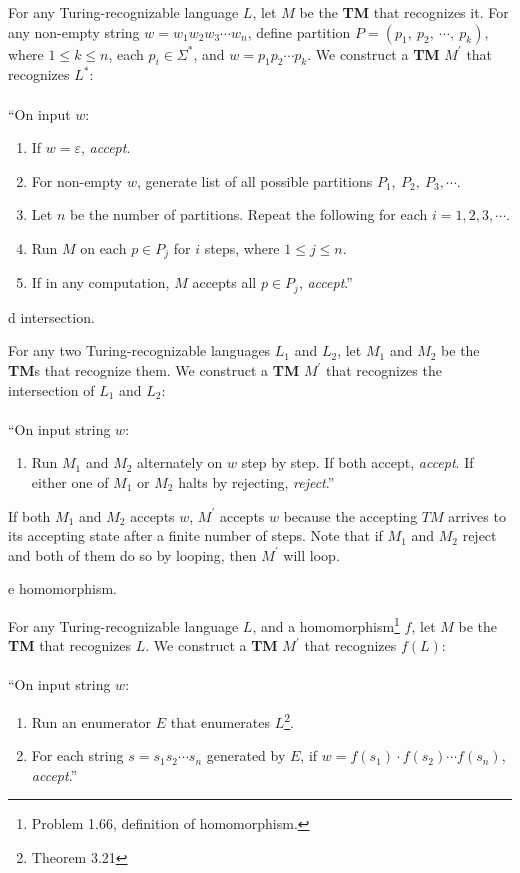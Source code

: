 \documentclass[11pt]{article}
\begin{document}
For any Turing-recognizable language $L$, let $M$ be the \textbf{TM} that recognizes it. For any non-empty string $w = w_1w_2w_3 \cdots w_n$, define partition $P = (p_1, \  p_2, \ \cdots , \ p_k)$, where $1 \leq k \leq n$, each $p_i \in \Sigma^{*}$, and $w = p_1  p_2 \cdots p_k$. We construct a \textbf{TM} $M^{'}$ that recognizes $L^{*}$: \\
\\
\textquotedblleft On input $w$:
\begin{enumerate}
\item If $w = \varepsilon$, \textit{accept}.
\item For non-empty $w$, generate list of all possible partitions $P_1, \ P_2, \ P_3, \cdots$.
\item Let $n$ be the number of partitions. Repeat the following for each $i = 1, 2, 3, \cdots$.
\item \hspace*{0.5cm} Run $M$ on each $p \in P_j$ for $i$ steps, where $1 \leq j \leq n$.
\item \hspace*{0.5cm} If in any computation, $M$ accepts all $p \in P_j$, \textit{accept}.\textquotedblright
\end{enumerate}

\begin{problem}[Part]{d}
intersection.
\end{problem}

For any two Turing-recognizable languages $L_1$ and $L_2$, let $M_1$ and $M_2$ be the \textbf{TM}s that recognize them. We construct a \textbf{TM} $M^{'}$ that recognizes the intersection of $L_1$ and $L_2$: \\
\\
\textquotedblleft On input string $w$:
\begin{enumerate}
\item Run $M_1$ and $M_2$ alternately on $w$ step by step. If both accept, \textit{accept}. If either one of $M_1$ or $M_2$ halts by rejecting, \textit{reject}.\textquotedblright
\end{enumerate}
If both $M_1$ and $M_2$ accepts $w$, $M^{'}$ accepts $w$ because the accepting $TM$ arrives to its accepting state after a finite number of steps. Note that if $M_1$ and $M_2$ reject and both of them do so by looping, then $M^{'}$ will loop.

\begin{problem}[Part]{e}
homomorphism.
\end{problem}

For any Turing-recognizable language $L$, and a homomorphism\footnote{Problem 1.66, definition of homomorphism.} $f$, let $M$ be the \textbf{TM} that recognizes $L$. We construct a \textbf{TM} $M^{'}$ that recognizes $f(L)$: \\
\\
\textquotedblleft On input string $w$:
\begin{enumerate}
\item Run an enumerator $E$ that enumerates $L$\footnote{Theorem 3.21}.
\item For each string $s=s_1s_2 \cdots s_n$ generated by $E$, if $w = f(s_1) \cdot f(s_2) \cdots f(s_n)$, \textit{accept}.\textquotedblright
\end{enumerate}
\end{document}
